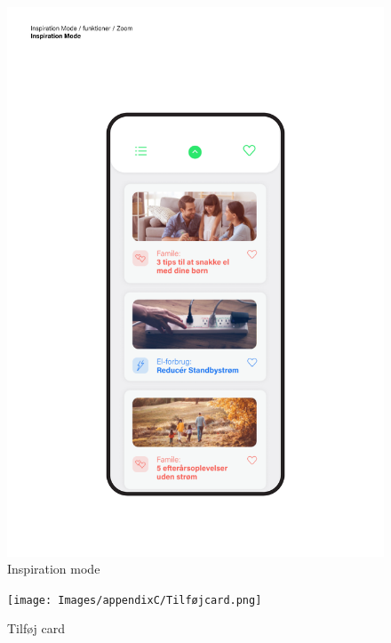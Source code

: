 \begin{figure}
    \centering
    \includegraphics[width=\textwidth]{Images/appendixC/Inspiration.png}
    \caption{Inspiration mode}
    \label{img:mockup:inspiration}
\end{figure}

\begin{figure}
    \centering
    \texttt{[image: Images/appendixC/Tilføjcard.png]}
    \caption{Tilføj card}
    \label{img:mockup:addcard}
\end{figure}